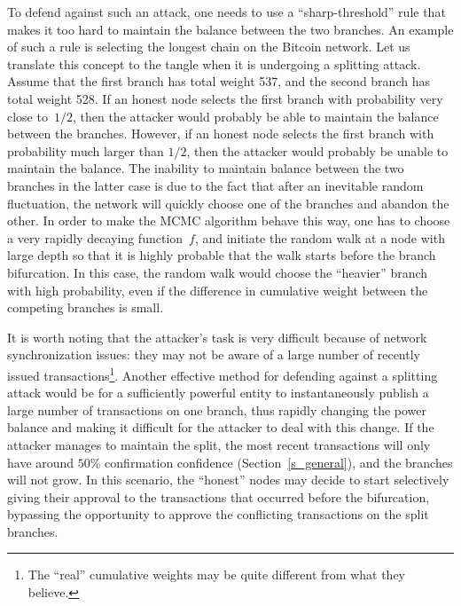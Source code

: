 \documentclass[12pt]{article}
\begin{document}
To defend against such an attack, one needs to use a
``sharp-threshold'' rule 
that makes it too hard to maintain the balance
between the two branches. An example of such a rule is 
selecting the longest chain on the Bitcoin network. Let us 
translate this concept to the tangle when it is undergoing a 
splitting attack. Assume that
the first branch has total weight 537, and the second branch 
has total weight 528. If an honest
node selects the first branch with probability very close to~$1/2$,
then the attacker would probably be able to maintain the
balance between the branches. However, if an honest
node selects the first branch with probability
much larger than $1/2$, then the attacker would probably
be unable to maintain the
balance. The inability to maintain balance between the two branches in 
the latter case is due to the fact that after an inevitable random fluctuation,
the network will quickly choose one of the branches and abandon the other. 
In order to make the MCMC algorithm behave this way,
one has to choose a very rapidly decaying function~$f$,
and initiate the random walk at a node with
 large depth so that it is highly probable
that the walk starts before the branch bifurcation.
In this case, the random walk would choose the ``heavier''
branch with high probability, even if the difference in
 cumulative weight between the competing branches is small. 

It is worth noting that the attacker's task is very 
difficult because of network synchronization
issues: they may not be aware of a large number 
of recently issued transactions\footnote{The ``real''
cumulative weights may be quite different from 
what they believe.}. Another effective 
method for defending against a 
splitting attack would be for a sufficiently
powerful entity to instantaneously publish a large number
 of transactions on one branch, thus rapidly changing the power balance
and making it difficult for the attacker to deal with this change. 
If the attacker manages to maintain
the split, the most recent transactions will only have around $50$\%
 confirmation confidence (Section~\ref{s_general}), and the branches 
will not grow. In this scenario, the ``honest'' nodes may decide to start 
selectively giving their approval to the transactions that occurred before 
the bifurcation, bypassing the opportunity to approve the conflicting 
transactions on the split branches.
\end{document}
